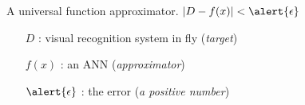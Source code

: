 \documentclass[10pt]{beamer}
\begin{document}


\begin{frame}[fragile]{A universal function approximator.}
$|D - f(x)| < \alert{\epsilon}$ 
\begin{itemize}
\item[$D$] : visual recognition system in fly (\textit{target})\\
\item[$f(x)$] : an ANN (\textit{approximator})
\item[$\alert{\epsilon}$] : the error (\textit{a positive number})
\end{itemize}
\end{frame}
\end{document}
